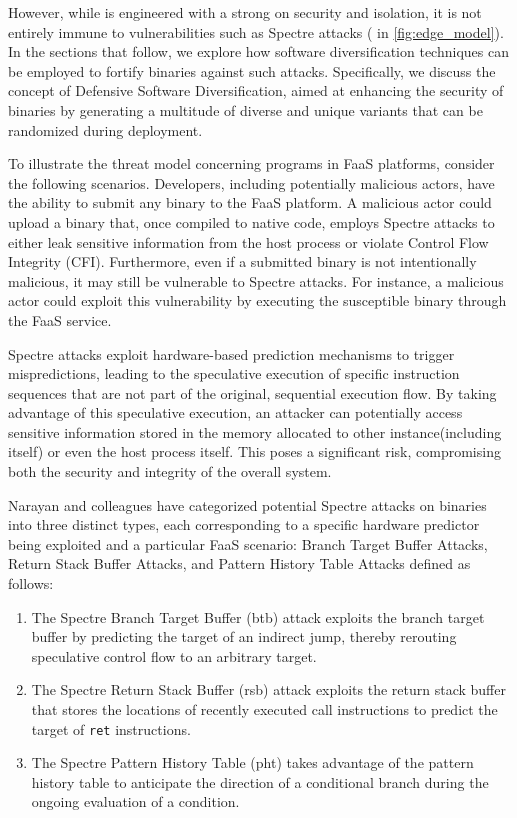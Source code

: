 However, while \Wasm is engineered with a strong on security and isolation, it is not entirely immune to vulnerabilities such as Spectre attacks \cite{Spectre,Narayan2021Swivel} ( in \autoref{fig:edge_model}). 
In the sections that follow, we explore how software diversification techniques can be employed to fortify \Wasm binaries against such attacks. 
Specifically, we discuss the concept of Defensive Software Diversification, aimed at enhancing the security of \Wasm binaries by generating a multitude of diverse and unique \Wasm variants that can be randomized during deployment.


To illustrate the threat model concerning \Wasm programs in FaaS platforms, consider the following scenarios. 
Developers, including potentially malicious actors, have the ability to submit any \Wasm binary to the FaaS platform. 
A malicious actor could upload a \Wasm binary that, once compiled to native code, employs Spectre attacks to either leak sensitive information from the host process or violate Control Flow Integrity (CFI).
Furthermore, even if a submitted \Wasm binary is not intentionally malicious, it may still be vulnerable to Spectre attacks. 
For instance, a malicious actor could exploit this vulnerability by executing the susceptible binary through the FaaS service. 

Spectre attacks exploit hardware-based prediction mechanisms to trigger mispredictions, leading to the speculative execution of specific instruction sequences that are not part of the original, sequential execution flow. 
By taking advantage of this speculative execution, an attacker can potentially access sensitive information stored in the memory allocated to other \Wasm instance(including itself) or even the host process itself. 
This poses a significant risk, compromising both the security and integrity of the overall system.

Narayan and colleagues \cite{Narayan2021Swivel} have categorized potential Spectre attacks on \wasm binaries into three distinct types, each corresponding to a specific hardware predictor being exploited and a particular FaaS scenario: Branch Target Buffer Attacks,  Return Stack Buffer Attacks, and Pattern History Table Attacks defined as follows:

\begin{enumerate}
    \item The Spectre Branch Target Buffer (btb) attack exploits the branch target buffer by predicting the target of an indirect jump, thereby rerouting speculative control flow to an arbitrary target.
    \item  The Spectre Return Stack Buffer (rsb) attack exploits the return stack buffer that stores the locations of recently executed call instructions to predict the target of \texttt{ret} instructions.
    \item The Spectre Pattern History Table (pht) takes advantage of the pattern history table to anticipate the direction of a conditional branch during the ongoing evaluation of a condition.
\end{enumerate}


